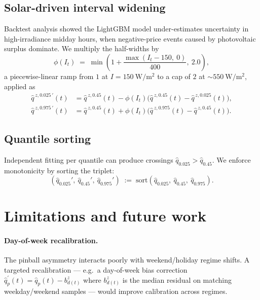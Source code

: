 \documentclass[11pt,a4paper]{article}
\begin{document}
\subsection{Solar-driven interval widening}

Backtest analysis showed the LightGBM model under-estimates uncertainty
in high-irradiance midday hours, when negative-price events caused by
photovoltaic surplus dominate. We multiply the half-widths by
\begin{equation}
  \phi(I_t) \;=\;
  \min\!\left(1 + \frac{\max(I_t - 150,\ 0)}{400},\ 2.0\right),
\end{equation}
a piecewise-linear ramp from $1$ at $I = 150~\mathrm{W/m^2}$
to a cap of $2$ at $\sim 550~\mathrm{W/m^2}$, applied as
\begin{align}
  \hat{q}^{\,z,0.025\,\prime}(t)
    &= \hat{q}^{\,z,0.45}(t) - \phi(I_t)\bigl(\hat{q}^{\,z,0.45}(t) - \hat{q}^{\,z,0.025}(t)\bigr), \\
  \hat{q}^{\,z,0.975\,\prime}(t)
    &= \hat{q}^{\,z,0.45}(t) + \phi(I_t)\bigl(\hat{q}^{\,z,0.975}(t) - \hat{q}^{\,z,0.45}(t)\bigr).
\end{align}

\subsection{Quantile sorting}

Independent fitting per quantile can produce crossings
$\hat{q}_{0.025} > \hat{q}_{0.45}$. We enforce monotonicity by sorting
the triplet:
\begin{equation}
  (\hat{q}_{0.025}',\ \hat{q}_{0.45}',\ \hat{q}_{0.975}')
  \;:=\; \mathrm{sort}(\hat{q}_{0.025},\ \hat{q}_{0.45},\ \hat{q}_{0.975}).
\end{equation}

\section{Limitations and future work}

\paragraph{Day-of-week recalibration.}
The pinball asymmetry interacts poorly with weekend/holiday regime
shifts. A targeted recalibration --- e.g.\ a day-of-week bias
correction
$\hat{q}^{\prime}_{p}(t) = \hat{q}_p(t) - b^{z}_{d(t)}$ where
$b^{z}_{d(t)}$ is the median residual on matching weekday/weekend
samples --- would improve calibration across regimes.
\end{document}
